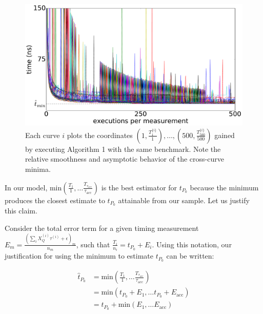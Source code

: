 \documentclass[conference]{IEEEtran}
\begin{document}
\begin{figure}[H]
\centering
\includegraphics[width=\columnwidth]{figures/fig2/linear_scan_branchsum}
\caption{Each curve $i$ plots the coordinates
$\left(1, \frac{T^{\{i\}}_1}{1}\right), \dots,
\left(500, \frac{T^{\{i\}}_{500}}{500}\right)$
gained by executing Algorithm 1 with the same benchmark. Note the relative
smoothness and asymptotic behavior of the cross-curve minima.}
\label{fig:scaling}
\end{figure}

In our model, $\textrm{min}(\frac{T_1}{1}, \dots
\frac{T_{\tau_{\textrm{acc}}}}{\tau_{\textrm{acc}}})$ is the best estimator for $t_{P_0}$
because the minimum produces the closest estimate to $t_{P_0}$ attainable from our sample.
Let us justify this claim.

Consider the total error term for a given timing measurement $E_m = \frac{\left(\sum_{i}
X_Q^{(i)} \tau^{(i)} + \epsilon \right)_m}{n_m}$, such that $\frac{T_i}{n_i} = t_{P_0} +
E_i$. Using this notation, our justification for using the minimum to estimate $t_{P_0}$ can
be written:

\begin{align}
    \hat{t}_{P_0} &= \textrm{min}(\frac{T_1}{1}, \dots \frac{T_{\tau_{\textrm{acc}}}}{\tau_{\textrm{acc}}}) \\ \nonumber
                  &= \textrm{min}(t_{P_0} + E_1, \dots t_{P_0} + E_{\textrm{acc}}) \\ \nonumber
                  &= t_{P_0} + \textrm{min}(E_1, \dots E_{\textrm{acc}}) \\ \nonumber
\end{align}
\end{document}
